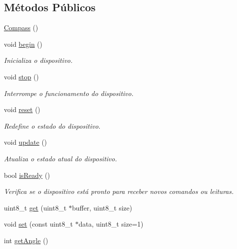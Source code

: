 \subsection*{Métodos Públicos}
\begin{DoxyCompactItemize}
\item 
\hyperlink{classCompass_a68bd2a073cc0d461b2b46529aae04765}{Compass} ()
\item 
void \hyperlink{classCompass_a987d9ba6c1773c14a0758e46fe4dac9d}{begin} ()
\begin{DoxyCompactList}\small\item\em Inicializa o dispositivo. \end{DoxyCompactList}\item 
void \hyperlink{classCompass_a1a550ee5183625110a0444e38920723b}{stop} ()
\begin{DoxyCompactList}\small\item\em Interrompe o funcionamento do dispositivo. \end{DoxyCompactList}\item 
void \hyperlink{classCompass_aabf8451561e0748b6de05a2cbd6ab780}{reset} ()
\begin{DoxyCompactList}\small\item\em Redefine o estado do dispositivo. \end{DoxyCompactList}\item 
void \hyperlink{classCompass_a9ffa2943fec2ba6154a0f9e21cfb0b73}{update} ()
\begin{DoxyCompactList}\small\item\em Atualiza o estado atual do dispositivo. \end{DoxyCompactList}\item 
bool \hyperlink{classCompass_aec5e3e1aa8472ad7759b048d3b9522d6}{is\-Ready} ()
\begin{DoxyCompactList}\small\item\em Verifica se o dispositivo está pronto para receber novos comandos ou leituras. \end{DoxyCompactList}\item 
uint8\-\_\-t \hyperlink{classCompass_a8ed68e06b27567738cd37e4be8d0d342}{get} (uint8\-\_\-t $\ast$buffer, uint8\-\_\-t size)
\item 
void \hyperlink{classCompass_ab74dbf60e82e054f7a5d35314c89029e}{set} (const uint8\-\_\-t $\ast$data, uint8\-\_\-t size=1)
\item 
int \hyperlink{classCompass_ae431d3e75f104dab21c72968fbbd6c89}{get\-Angle} ()
\end{DoxyCompactItemize}


